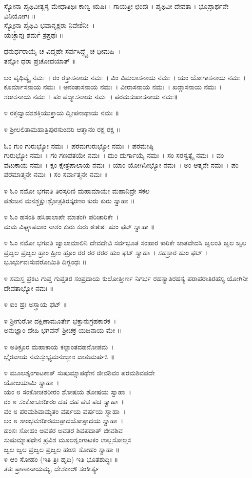 ಸ್ಯೋನಾ ಪೃಥಿವೀತ್ಯಸ್ಯ ಮೇಧಾತಿಥಿಃ ಕಾಣ್ವ ಋಷಿಃ । ಗಾಯತ್ರೀ ಛಂದಃ । ಪೃಥಿವೀ ದೇವತಾ । ಭೂಪ್ರಾರ್ಥನೇ ವಿನಿಯೋಗಃ ॥\\
ಸ್ಯೋ॒ನಾ ಪೃ॑ಥಿವಿ ಭವಾನೃಕ್ಷ॒ರಾ ನಿ॒ವೇಶ॑ನೀ~।\\ ಯಚ್ಛಾ᳚ನಃ॒ ಶರ್ಮ॑ ಸ॒ಪ್ರಥಃ॑ ॥

ಧನುರ್ಧರಾಯೈ ಚ ವಿದ್ಮಹೇ ಸರ್ವಸಿದ್ಧ್ಯೈ ಚ ಧೀಮಹಿ~।\\ ತನ್ನೋ ಧರಾ ಪ್ರಚೋದಯಾತ್ ॥

ಲಂ ಪೃಥಿವ್ಯೈ ನಮಃ~। ರಂ ರಕ್ತಾಸನಾಯ ನಮಃ~। ವಿಂ ವಿಮಲಾಸನಾಯ ನಮಃ~। ಯಂ ಯೋಗಾಸನಾಯ ನಮಃ~। ಕೂರ್ಮಾಸನಾಯ ನಮಃ~। ಅನಂತಾಸನಾಯ ನಮಃ~। ವೀರಾಸನಾಯ ನಮಃ~। ಖಡ್ಗಾಸನಾಯ ನಮಃ~। ಶರಾಸನಾಯ ನಮಃ~। ಪಂ ಪದ್ಮಾಸನಾಯ ನಮಃ~। ಪರಮಸುಖಾಸನಾಯ ನಮಃ॥

೪ ರಕ್ತದ್ವಾದಶಶಕ್ತಿಯುಕ್ತಾಯ ದ್ವೀಪನಾಥಾಯ ನಮಃ ॥

೪ ಶ್ರೀಲಲಿತಾಮಹಾತ್ರಿಪುರಸುಂದರಿ ಆತ್ಮಾನಂ ರಕ್ಷ ರಕ್ಷ ॥

ಓಂ ಗುಂ ಗುರುಭ್ಯೋ ನಮಃ~। ಪರಮಗುರುಭ್ಯೋ ನಮಃ~। ಪರಮೇಷ್ಠಿ\\ಗುರುಭ್ಯೋ ನಮಃ~। ಗಂ ಗಣಪತಯೇ ನಮಃ~। ದುಂ ದುರ್ಗಾಯೈ ನಮಃ~। ಸಂ ಸರಸ್ವತ್ಯೈ ನಮಃ~। ವಂ ವಟುಕಾಯ ನಮಃ~। ಕ್ಷಂ ಕ್ಷೇತ್ರಪಾಲಾಯ ನಮಃ~। ಯಾಂ ಯೋಗಿನೀಭ್ಯೋ ನಮಃ~। ಅಂ ಆತ್ಮನೇ ನಮಃ~। ಪಂ ಪರಮಾತ್ಮನೇ ನಮಃ~। ಸಂ ಸರ್ವಾತ್ಮನೇ ನಮಃ ॥

೪ ಓಂ ನಮೋ ಭಗವತಿ ತಿರಸ್ಕರಿಣಿ ಮಹಾಮಾಯೇ ಮಹಾನಿದ್ರೇ ಸಕಲ \\ಪಶುಜನ ಮನಶ್ಚಕ್ಷುಃಶ್ರೋತ್ರತಿರಸ್ಕರಣಂ ಕುರು ಕುರು ಸ್ವಾಹಾ ॥

೪ ಓಂ ಹಸಂತಿ ಹಸಿತಾಲಾಪೇ ಮಾತಂಗಿ ಪರಿಚಾರಿಕೇ~।\\
ಮಮ ವಿಘ್ನಾಪದಾಂ ನಾಶಂ ಕುರು ಕುರು ಠಃಠಃಠಃ ಹುಂ ಫಟ್ ಸ್ವಾಹಾ ॥

೪ ಓಂ ನಮೋ ಭಗವತಿ ಜ್ವಾಲಾಮಾಲಿನಿ ದೇವದೇವಿ ಸರ್ವಭೂತ ಸಂಹಾರ ಕಾರಿಕೇ ಜಾತವೇದಸಿ ಜ್ವಲಂತಿ ಜ್ವಲ ಜ್ವಲ ಪ್ರಜ್ವಲ ಪ್ರಜ್ವಲ ಹ್ರಾಂ ಹ್ರೀಂ ಹ್ರೂಂ ರರ ರರ ರರರ ಹುಂ ಫಟ್ ಸ್ವಾಹಾ~। ಸಹಸ್ರಾರ ಹುಂ ಫಟ್~।\\ ಭೂರ್ಭುವಃಸುವರೋಮಿತಿ ದಿಗ್ಬಂಧಃ ॥

೪ ಸಮಸ್ತ ಪ್ರಕಟ ಗುಪ್ತ ಗುಪ್ತತರ ಸಂಪ್ರದಾಯ ಕುಲೋತ್ತೀರ್ಣ ನಿಗರ್ಭ ರಹಸ್ಯಾ\-ತಿರಹಸ್ಯ ಪರಾಪರಾತಿರಹಸ್ಯ ಯೋಗಿನೀ ದೇವತಾಭ್ಯೋ ನಮಃ ॥

೪ ಐಂ ಹ್ರಃ ಅಸ್ತ್ರಾಯ ಫಟ್ ॥

೪ ಶ್ರೀಗುರೋ ದಕ್ಷಿಣಾಮೂರ್ತೇ ಭಕ್ತಾನುಗ್ರಹಕಾರಕ~।\\
ಅನುಜ್ಞಾಂ ದೇಹಿ ಭಗವನ್ ಶ್ರೀಚಕ್ರ ಯಜನಾಯ ಮೇ ॥

೪ ಅತಿಕ್ರೂರ ಮಹಾಕಾಯ ಕಲ್ಪಾಂತದಹನೋಪಮ~।\\
ಭೈರವಾಯ ನಮಸ್ತುಭ್ಯಮನುಜ್ಞಾಂ ದಾತುಮರ್ಹಸಿ ॥

೪ ಮೂಲಶೃಂಗಾಟಕಾತ್ ಸುಷುಮ್ನಾಪಥೇನ ಜೀವಶಿವಂ ಪರಮಶಿವಪದೇ \\ಯೋಜಯಾಮಿ ಸ್ವಾಹಾ~।\\
ಯಂ ೮ ಸಂಕೋಚಶರೀರಂ ಶೋಷಯ ಶೋಷಯ ಸ್ವಾಹಾ~।\\
ರಂ ೮ ಸಂಕೋಚಶರೀರಂ ದಹ ದಹ ಪಚ ಪಚ ಸ್ವಾಹಾ~।\\
ವಂ ೮ ಪರಮಶಿವಾಮೃತಂ ವರ್ಷಯ ವರ್ಷಯ ಸ್ವಾಹಾ~।\\
ಲಂ ೮ ಶಾಂಭವಶರೀರಮುತ್ಪಾದಯೋತ್ಪಾದಯ ಸ್ವಾಹಾ~।\\
ಹಂಸಃ ಸೋಹಂ ಅವತರ ಅವತರ ಶಿವಪದಾತ್ ಜೀವಶಿವ\\ ಸುಷುಮ್ನಾಪಥೇನ ಪ್ರವಿಶ ಮೂಲಶೃಂಗಾಟಕಂ ಉಲ್ಲಸೋಲ್ಲಸ\\ ಜ್ವಲ ಜ್ವಲ ಪ್ರಜ್ವಲ ಪ್ರಜ್ವಲ ಹಂಸಃ ಸೋಹಂ ಸ್ವಾಹಾ ॥\\
೪ ಆಂ ಸೋಹಂ (ಇತಿ ತ್ರಿಃ ಹೃದಿ) ಇತಿ ಭೂತಶುದ್ಧಿಃ ॥\\
ತತಃ ಪ್ರಾಣಾನಾಯಮ್ಯ, ದೇಶಕಾಲೌ ಸಂಕೀರ್ತ್ಯ 
